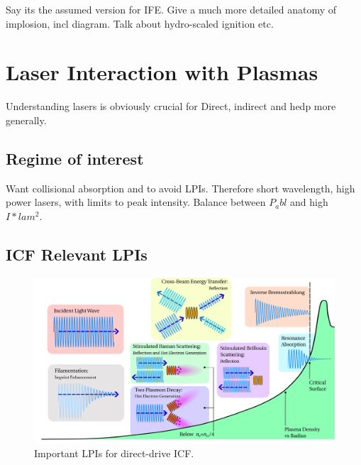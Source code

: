 Say its the assumed version for IFE.
Give a much more detailed anatomy of implosion, incl diagram.
Talk about hydro-scaled ignition etc.

\section{Laser Interaction with Plasmas}%
\label{sec:intro_laserplasmas}

Understanding lasers is obviously crucial for Direct, indirect and hedp more generally.

\subsection{Regime of interest}%
\label{sec:intro_laser_regime}

Want collisional absorption and to avoid LPIs.
Therefore short wavelength, high power lasers, with limits to peak intensity.
Balance between $P_abl$ and high $I*lam^2$.

\subsection{ICF Relevant LPIs}%
\label{sec:intro_LPIs}

\begin{figure}[t!]
    \includegraphics[width=\linewidth]{Introduction/Images/LPI diagram.png}
    \centering
    \caption{Important \ac{LPIs} for direct-drive \ac{ICF}.
    }%
    \label{fig:intro_dd_lpis}
\end{figure}

